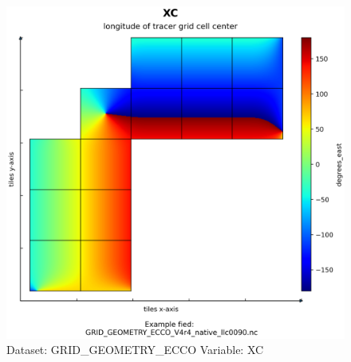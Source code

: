 \begin{figure}[H]
\centering
\includegraphics[width=\textwidth]{../images/plots/native_plots_coords/Geometry_Parameters_for_the_Lat-Lon-Cap_90_(llc90)_Native_Model_Grid_(Version_4_Release_4)/XC.png}
\caption{Dataset: GRID\_GEOMETRY\_ECCO Variable: XC}
\label{tab:table-GRID_GEOMETRY_ECCO_XC-Plot}
\end{figure}
\pagebreak
